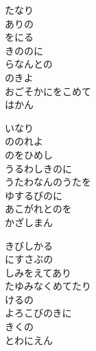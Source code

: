 \documentclass[10pt,b5j]{tarticle} %
\begin{document}
\vspace{1.5em} %
\newcommand{\linespace}{0.5em} %
\newcommand{\blocksize}{0.5\hsize} %
\begin{enumerate} %
    \begin{minipage}[c]{\blocksize}
    
        \vspace{\linespace}
        \item
        たなり\\
        ありの\\
        をにる\\
        きののに\\
        らなんとの\\
        のきよ\\
        おごそかにをこめて\\
        はかん
        
        \vspace{\linespace}
        \item
        いなり\\
        ののれよ\\
        のをひめし\\
        うるわしきのに\\
        うたわなんのうたを\\
        ゆするびのに\\
        あこがれとのを\\
        かざしまん
        
        \vspace{\linespace}
        \item
        きびしかる\\
        にすさぶの\\
        しみをえてあり\\
        たゆみなくめてたり\\
        けるの\\
        よろこびのきに\\
        きくの\\
        とわにえん
    
    \end{minipage}
\end{enumerate} %
\end{document}
